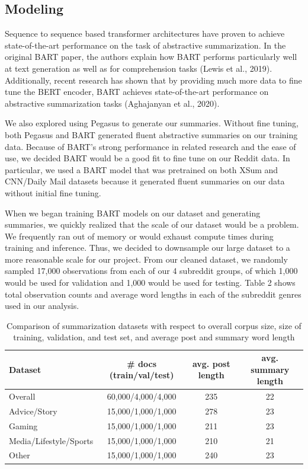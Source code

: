 \documentclass[11pt,a4paper, twocolumn]{article}
\begin{document}
\subsection{Modeling}

Sequence to sequence based transformer architectures have proven to achieve state-of-the-art performance on the task of abstractive summarization.
In the original BART paper, the authors explain how BART performs particularly well at text generation as well as for comprehension tasks (Lewis et al., 2019). 
Additionally, recent research has shown that by providing much more data to fine tune the BERT encoder, 
BART achieves state-of-the-art performance on abstractive summarization tasks (Aghajanyan et al., 2020). 

We also explored using Pegasus to generate our summaries. 
Without fine tuning, both Pegasus and BART generated fluent abstractive summaries on our training data. 
Because of BART's strong performance in related research and the ease of use, we decided BART would be a good fit to fine tune on our Reddit data. 
In particular, we used a BART model that was pretrained on both XSum and CNN/Daily Mail datasets because it generated fluent summaries on our data without initial fine tuning. 

When we began training BART models on our dataset and generating summaries, we quickly realized that the scale of our dataset would be a problem. 
We frequently ran out of memory or would exhaust compute times during training and inference. 
Thus, we decided to downsample our large dataset to a more reasonable scale for our project. 
From our cleaned dataset, we randomly sampled 17,000 observations from each of our 4 subreddit groups,
of which 1,000 would be used for validation and 1,000 would be used for testing. 
Table 2 shows total observation counts and average word lengths in each of the subreddit genres used in our analysis. 

\begin{table}
  \centering
  \begin{tabular}{lccc}
  \hline \textbf{Dataset} & \textbf{\# docs (train/val/test)} & \textbf{avg. post length} & \textbf{avg. summary length} \\ \hline
  Overall & 60,000/4,000/4,000  & 235 & 22 \\
  Advice/Story & 15,000/1,000/1,000 & 278 & 23 \\
  Gaming & 15,000/1,000/1,000 & 211 & 23 \\
  Media/Lifestyle/Sports & 15,000/1,000/1,000 & 210 & 21 \\
  Other & 15,000/1,000/1,000 & 240 & 23 \\
  \hline
  \end{tabular}
  \caption{\label{final_counts} Comparison of summarization datasets with respect to overall corpus size, size of training, validation, and
  test set, and average post and summary word length}
\end{table}
\end{document}
